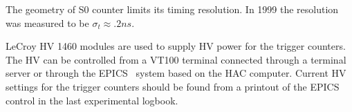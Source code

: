 {{  The geometry of S0 counter limits its timing resolution. In 1999
  the resolution was measured to be $\sigma_t \approx .2{ns}$.
  
  LeCroy HV 1460 modules are used to supply HV power for the trigger
  counters. The HV can be controlled from a VT100 terminal connected through
  a terminal server or through the EPICS~\cite{EPICSwww} system based on the HAC computer.
  Current HV settings for the trigger counters should be found from a
  printout of the EPICS control in the last experimental logbook.
  
}
}


